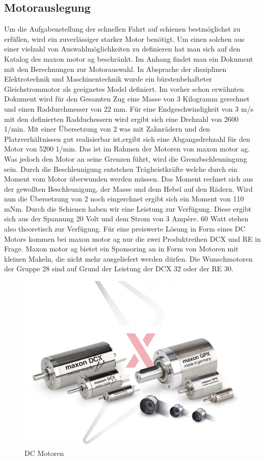 \documentclass[../../main.tex]{subfiles}
\begin{document}
    \subsection{Motorauslegung}
    Um die Aufgabenstellung der schnellen Fahrt auf schienen bestmöglichst zu erfüllen, wird ein zuverlässiger starker Motor benötigt. Um einen solchen aus einer vielzahl von Auswahlmöglichkeiten zu definieren hat man sich auf den Katalog des maxon motor ag beschränkt. Im Anhang findet man ein Dokument mit den Berechnungen zur Motorauswahl. In Absprache der disziplinen Elektrotechnik und Maschinentechnik wurde ein  bürstenbehafteter Gleichstrommotor als geeignetes Model definiert. Im vorher schon erwähnten Dokument wird für den Gesamten Zug eine Masse von 3 Kilogramm gerechnet und einen Raddurchmesser von 22 mm. Für eine Endgeschwindigkeit von 3 m/s mit den definierten Radduchessern wird ergibt sich eine Drehzahl von 2600 1/min. Mit einer Übersetzung von 2 was mit Zahnrädern und den Platzverhältnissen gut realisierbar ist,ergibt sich eine Abgangsdrehzahl für den Motor von 5200 1/min. Das ist im Rahmen der Motoren von maxon motor ag. Was jedoch den Motor an seine Grenzen führt, wird die Grenzbschleuningung sein. Durch die Beschleunigung entstehen Trägheistkräfte welche durch ein Moment vom Motor überwunden werden müssen. Das Moment rechnet sich aus der gewollten Beschleunigung, der Masse und dem Hebel auf den Rädern. Wird nun die Übersetzung von 2 noch eingerchnet ergibt sich ein Moment von 110 mNm. Durch die Schienen haben wir eine Leistung zur Verfügung. Diese ergibt sich aus der Spannung 20 Volt und dem Strom von 3 Ampère. 60 Watt stehen also theoretisch zur Verfügung. Für eine preiswerte Lösung in Form eines DC Motors kommen bei maxon motor ag nur die zwei Produktreihen DCX und RE in Frage. Maxon motor ag bietet ein Sponsoring an in Form von Motoren mit kleinen Makeln, die nicht mehr ausgeliefert werden dürfen. Die Wunschmotoren der Gruppe 28 sind auf Grund der Leistung der DCX 32 oder der RE 30.

    \begin{figure}[H]
        \centering
        \includegraphics[width=1.0\textwidth]{../../images/Kran/Motors.JPG}
        \caption {DC Motoren}
        \label{fig:et_komponenten}
    \end{figure}


    
\end{document}
